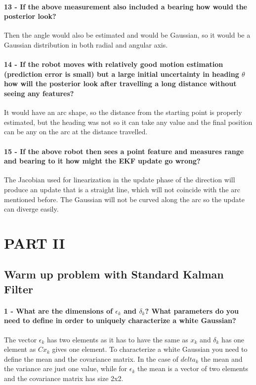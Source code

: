 \documentclass[12pt]{article}
\begin{document}
\paragraph{13 - If the above measurement also included a bearing how would the posterior
look?}
Then the angle would also be estimated and would be Gaussian, so it would be a Gaussian distribution in both radial and angular axis.

\paragraph{14 - If the robot moves with relatively good motion estimation (prediction error
is small) but a large initial uncertainty in heading \(\theta\) how will the posterior
look after travelling a long distance without seeing any features?}
It would have an arc shape, so the distance from the starting point is properly estimated, but the heading was not so it can take any value and the final position can be any on the arc at the distance travelled.

\paragraph{15 - If the above robot then sees a point feature and measures range and bearing to it how might the EKF update go wrong?}
The Jacobian used for linearization in the update phase of the direction will produce an update that is a straight line, which will not coincide with the arc mentioned before. The Gaussian will not be curved along the arc so the update can diverge easily.

\section{PART II}
\subsection{Warm up problem with Standard Kalman Filter}
\paragraph{1 - What are the dimensions of \(\epsilon_k\) and \(\delta_k\)? What parameters do you need to define in order to uniquely characterize a white Gaussian?}
The vector \(\epsilon_k\) has two elements as it has to have the same as \(x_k\) and \(\delta_k\) has one element as \(Cx_k\) gives one element. To characterize a white Gaussian you need to define the mean and the covariance matrix. In the case of \(delta_k\) the mean and the variance are just one value, while for \(\epsilon_k\) the mean is a vector of two elements and the covariance matrix has size 2x2.
\end{document}
